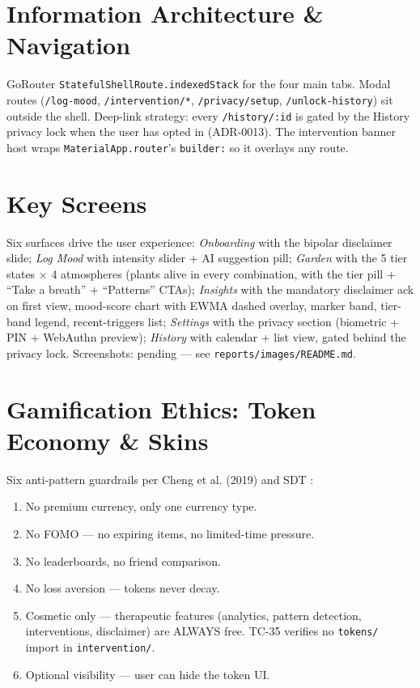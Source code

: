 \documentclass[11pt,a4paper]{article}
\begin{document}
\section{Information Architecture \& Navigation}

GoRouter \texttt{StatefulShellRoute.indexedStack} for the four main tabs.
Modal routes (\texttt{/log-mood}, \texttt{/intervention/*},
\texttt{/privacy/setup}, \texttt{/unlock-history}) sit outside the shell.
Deep-link strategy: every \texttt{/history/:id} is gated by the History
privacy lock when the user has opted in (ADR-0013). The intervention
banner host wraps \texttt{MaterialApp.router}'s \texttt{builder:} so it
overlays any route.

\section{Key Screens}

Six surfaces drive the user experience: \emph{Onboarding} with the
bipolar disclaimer slide; \emph{Log Mood} with intensity slider + AI
suggestion pill; \emph{Garden} with the 5 tier states $\times$ 4
atmospheres (plants alive in every combination, with the tier pill +
``Take a breath'' + ``Patterns'' CTAs); \emph{Insights} with the
mandatory disclaimer ack on first view, mood-score chart with EWMA
dashed overlay, marker band, tier-band legend, recent-triggers list;
\emph{Settings} with the privacy section (biometric + PIN + WebAuthn
preview); \emph{History} with calendar + list view, gated behind the
privacy lock. Screenshots: pending --- see
\texttt{reports/images/README.md}.

\section{Gamification Ethics: Token Economy \& Skins}

Six anti-pattern guardrails per Cheng et al. (2019) and SDT
\autocite{cheng2019gamification,deci2000sdt,ryan2017sdt}:

\begin{enumerate}[leftmargin=*]
\item No premium currency, only one currency type.
\item No FOMO --- no expiring items, no limited-time pressure.
\item No leaderboards, no friend comparison.
\item No loss aversion --- tokens never decay.
\item Cosmetic only --- therapeutic features (analytics, pattern detection, interventions, disclaimer) are ALWAYS free. TC-35 verifies no \texttt{tokens/} import in \texttt{intervention/}.
\item Optional visibility --- user can hide the token UI.
\end{enumerate}
\end{document}
